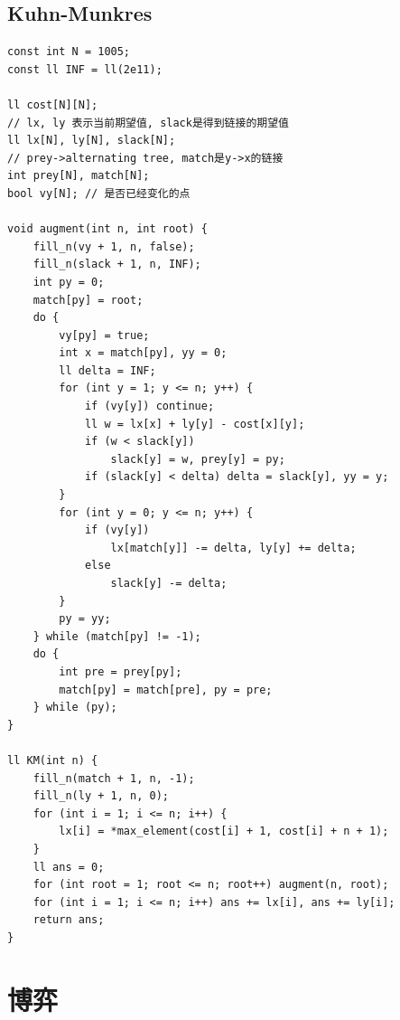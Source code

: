\documentclass[twoside]{article}
\begin{document}
\subsection{Kuhn-Munkres}
\begin{lstlisting}
const int N = 1005;
const ll INF = ll(2e11);

ll cost[N][N];
// lx, ly 表示当前期望值, slack是得到链接的期望值
ll lx[N], ly[N], slack[N];
// prey->alternating tree, match是y->x的链接
int prey[N], match[N];
bool vy[N]; // 是否已经变化的点

void augment(int n, int root) {
    fill_n(vy + 1, n, false);
    fill_n(slack + 1, n, INF);
    int py = 0;
    match[py] = root;
    do {
        vy[py] = true;
        int x = match[py], yy = 0;
        ll delta = INF;
        for (int y = 1; y <= n; y++) {
            if (vy[y]) continue;
            ll w = lx[x] + ly[y] - cost[x][y];
            if (w < slack[y])
                slack[y] = w, prey[y] = py;
            if (slack[y] < delta) delta = slack[y], yy = y;
        }
        for (int y = 0; y <= n; y++) {
            if (vy[y])
                lx[match[y]] -= delta, ly[y] += delta;
            else
                slack[y] -= delta;
        }
        py = yy;
    } while (match[py] != -1);
    do {
        int pre = prey[py];
        match[py] = match[pre], py = pre;
    } while (py);
}

ll KM(int n) {
    fill_n(match + 1, n, -1);
    fill_n(ly + 1, n, 0);
    for (int i = 1; i <= n; i++) {
        lx[i] = *max_element(cost[i] + 1, cost[i] + n + 1);
    }
    ll ans = 0;
    for (int root = 1; root <= n; root++) augment(n, root);
    for (int i = 1; i <= n; i++) ans += lx[i], ans += ly[i];
    return ans;
}\end{lstlisting}
\clearpage\section{博弈}
\end{document}
